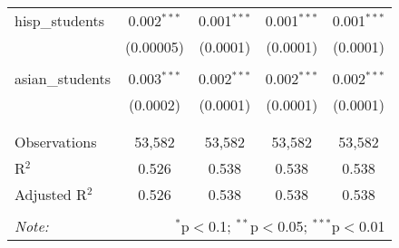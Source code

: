 \begin{table}[!htbp]
\begin{tabular}{@{\extracolsep{-2pt}}lcccc}
 hisp\_students & 0.002$^{***}$ & 0.001$^{***}$ & 0.001$^{***}$ & 0.001$^{***}$ \\ 
  & (0.00005) & (0.0001) & (0.0001) & (0.0001) \\ 
  & & & & \\ 
 asian\_students & 0.003$^{***}$ & 0.002$^{***}$ & 0.002$^{***}$ & 0.002$^{***}$ \\ 
  & (0.0002) & (0.0001) & (0.0001) & (0.0001) \\ 
  & & & & \\ 
\hline \\[-1.8ex] 
Observations & 53,582 & 53,582 & 53,582 & 53,582 \\ 
R$^{2}$ & 0.526 & 0.538 & 0.538 & 0.538 \\ 
Adjusted R$^{2}$ & 0.526 & 0.538 & 0.538 & 0.538 \\ 
\hline 
\hline \\[-1.8ex] 
\textit{Note:}  & \multicolumn{4}{r}{$^{*}$p$<$0.1; $^{**}$p$<$0.05; $^{***}$p$<$0.01} \\ 
\end{tabular} 
\end{table} 
